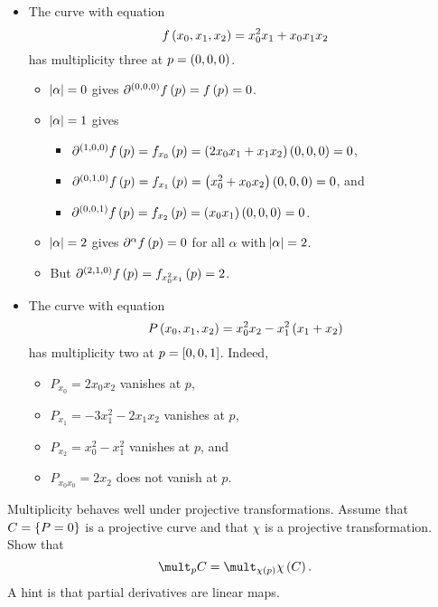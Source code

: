 \pagebreak

\begin{example}
\hfill
\begin{itemize}
\item The curve with equation
$$ f\br{x_0, x_1, x_2} = x_0^2x_1 + x_0x_1x_2 $$
has multiplicity three at $ p = \br{0, 0, 0} $.
\begin{itemize}
\item $ \abs{\alpha} = 0 $ gives $ \partial^{\br{0, 0, 0}} f\br{p} = f\br{p} = 0 $.
\item $ \abs{\alpha} = 1 $ gives
\begin{itemize}
\item $ \partial^{\br{1, 0, 0}} f\br{p} = f_{x_0}\br{p} = \br{2x_0x_1 + x_1x_2}\br{0, 0, 0} = 0 $,
\item $ \partial^{\br{0, 1, 0}} f\br{p} = f_{x_1}\br{p} = \br{x_0^2 + x_0x_2}\br{0, 0, 0} = 0 $, and
\item $ \partial^{\br{0, 0, 1}} f\br{p} = f_{x_2}\br{p} = \br{x_0x_1}\br{0, 0, 0} = 0 $.
\end{itemize}
\item $ \abs{\alpha} = 2 $ gives $ \partial^\alpha f\br{p} = 0 $ for all $ \alpha $ with $ \abs{\alpha} = 2 $.
\item But $ \partial^{\br{2, 1, 0}} f\br{p} = f_{x_0^2x_1}\br{p} = 2 $.
\end{itemize}
\item The curve with equation
$$ P\br{x_0, x_1, x_2} = x_0^2x_2 - x_1^2\br{x_1 + x_2} $$
has multiplicity two at $ p = \sbr{0, 0, 1} $. Indeed,
\begin{itemize}
\item $ P_{x_0} = 2x_0x_2 $ vanishes at $ p $,
\item $ P_{x_1} = -3x_1^2 - 2x_1x_2 $ vanishes at $ p $,
\item $ P_{x_2} = x_0^2 - x_1^2 $ vanishes at $ p $, and
\item $ P_{x_0x_0} = 2x_2 $ does not vanish at $ p $.
\end{itemize}
\end{itemize}
\end{example}

\begin{exercise**}
\label{ex:32}
Multiplicity behaves well under projective transformations. Assume that $ C = \cbr{P = 0} $ is a projective curve and that $ \chi $ is a projective transformation. Show that
$$ \mult_p C = \mult_{\chi\br{p}} \chi\br{C}. $$
A hint is that partial derivatives are linear maps.
\end{exercise**}

